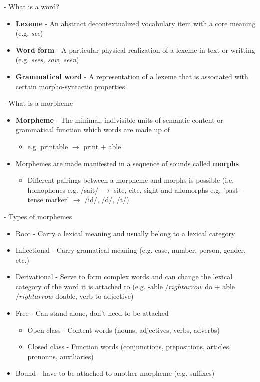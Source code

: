 \documentclass[11pt]{article}
\begin{document}
- What is a word?
\begin{itemize}
 \item \textbf{Lexeme} - An abstract decontextualized vocabulary item with a core meaning (e.g. {\it see})
 \item \textbf{Word form} - A particular physical realization of a lexeme in text or writting (e.g. {\it sees, saw, seen}) 
 \item \textbf{Grammatical word} - A representation of a lexeme that is associated with certain morpho-syntactic properties
\end{itemize}
- What is a morpheme
\begin{itemize}
 \item {\bf Morpheme} - The minimal, indivisible units of semantic content or grammatical function which words are made up of
  \begin{itemize}
   \item e.g. printable $\rightarrow$ print + able
  \end{itemize}
  \item Morphemes are made manifested in a sequence of sounds called {\bf morphs}
  \begin{itemize}
    \item Different pairings between a morpheme and morphs is possible (i.e. homophones e.g. /sait/ $\rightarrow$ site, cite, sight and allomorphs e.g. 'past-tense marker' $\rightarrow$ /id/, /d/, /t/)  
  \end{itemize}
\end{itemize}
- Types of morphemes
\begin{itemize}
 \item Root - Carry a lexical meaning and usually belong to a lexical category
 \item Inflectional - Carry gramatical meaning (e.g. case, number, person, gender, etc.)
 \item Derivational - Serve to form complex words and can change the lexical category of the word it is attached to (e.g. -able $/rightarrow$ do + able $/rightarrow$ doable, verb to adjective)
 \item Free - Can stand alone, don't need to be attached
  \begin{itemize}
    \item Open class - Content words (nouns, adjectives, verbs, adverbs)
    \item Closed class - Function words  (conjunctions, prepositions, articles, pronouns, auxiliaries)
  \end{itemize}
 \item Bound - have to be attached to another morpheme (e.g. suffixes)
\end{itemize}
\end{document}
